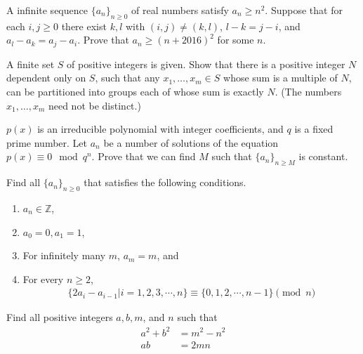 \documentclass[problems.tex]{subfile}
\begin{document}
	\begin{problem}
		A infinite sequence $\{ a_n \}_{n \ge 0}$ of real numbers satisfy $a_n \ge n^2$. Suppose that for each $i, j \ge 0$ there exist $k, l$ with $(i,j) \neq (k,l)$, $l - k = j - i$, and $a_l - a_k = a_j - a_i$. Prove that $a_n \ge (n + 2016)^2$ for some $n$. %
	\end{problem}

	\begin{problem}
		A finite set $S$ of positive integers is given. Show that there is a positive integer $N$ dependent only on $S$, such that any $x_1, \dots, x_m \in S$ whose sum is a multiple of $N$, can be partitioned into groups each of whose sum is exactly $N$. (The numbers $x_1, \dots, x_m$ need not be distinct.) %
	\end{problem}

	\begin{problem}
		$p(x)$ is an irreducible polynomial with integer coefficients, and $q$ is a fixed prime number. Let $a_n$ be a number of solutions of the equation $p(x)\equiv 0\mod q^n$. Prove that we can find $M$ such that $\{a_n\}_{n\ge M}$ is constant. %
	\end{problem}

	\begin{problem}
		Find all $\{a_n\}_{n\ge 0}$ that satisfies the following conditions.
		\begin{enumerate}
			\item $a_n\in \mathbb{Z}$,
			\item $a_0=0, a_1=1$,
			\item For infinitely many $m$, $a_m=m$, and
			\item For every $n\ge2$,
				\begin{align*}
					\{2a_i-a_{i-1} | i=1, 2, 3, \cdots , n\}\equiv \{0, 1, 2, \cdots , n-1\}\pmod n
				\end{align*}
		\end{enumerate}
	\end{problem}

	\begin{problem}
		Find all positive integers $a, b, m$, and $n$ such that
		\begin{align*}
			a^2+b^2 &=m^2-n^2\\
			ab &=2mn
		\end{align*}
	\end{problem}
\end{document}
